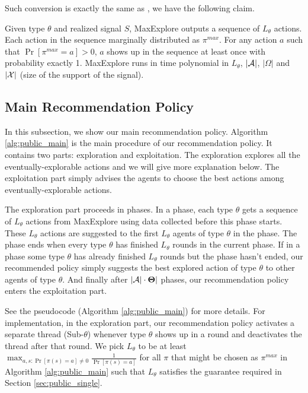 Such conversion is exactly the same as \cite{ICexplorationGames-ec16-working}, we have the following claim.

\begin{claim}
\label{clm:maxexplore}
Given type $\theta$ and realized signal $S$, MaxExplore outputs a sequence of $L_{\theta}$ actions.
Each action in the sequence marginally distributed as $\pi^{max}$.
For any action $a$ such that $\Pr[\pi^{max} =a] >0$, $a$ shows up in the sequence at least once with probability exactly 1.
MaxExplore runs in time polynomial in $L_{\theta}$, $|\mathcal{A}|$, $|\varOmega|$ and $|\mathcal{X}|$ (size of the support of the signal).
\end{claim}

\subsection{Main Recommendation Policy}
\label{sec:public_main}
In this subsection, we show our main recommendation policy. Algorithm \ref{alg:public_main} is the main procedure of our recommendation policy. It contains two parts: exploration and exploitation. The exploration explores all the eventually-explorable actions and we will give more explanation below. The exploitation part simply advises the agents to choose the best actions among eventually-explorable actions.

The exploration part proceeds in phases. In a phase, each type $\theta$ gets a sequence of $L_{\theta}$ actions from MaxExplore using data collected before this phase starts. These $L_{\theta}$ actions are suggested to the first $L_{\theta}$ agents of type $\theta$ in the phase. The phase ends when every type $\theta$ has finished $L_{\theta}$ rounds in the current phase. If in a phase some type $\theta$ has already finished $L_{\theta}$ rounds but the phase hasn't ended, our recommended policy simply suggests the best explored action of type $\theta$ to other agents of type $\theta$. And finally after $|\mathcal{A}| \cdot \bold{\Theta}|$ phases, our recommendation policy enters the exploitation part.

See the pseudocode (Algorithm \ref{alg:public_main}) for more details. For implementation, in the exploration part, our recommendation policy activates a separate thread (Sub-$\theta$) whenever type $\theta$ shows up in a round and deactivates the thread after that round. We pick $L_{\theta}$ to be at least $\max_{a,s: \Pr[\pi(s)=a] \neq 0} \frac{1}{\Pr[\pi(s)=a]}$ for all $\pi$ that might be chosen as $\pi^{max}$ in Algorithm \ref{alg:public_main} such that $L_{\theta}$ satisfies the guarantee required in Section \ref{sec:public_single}.

